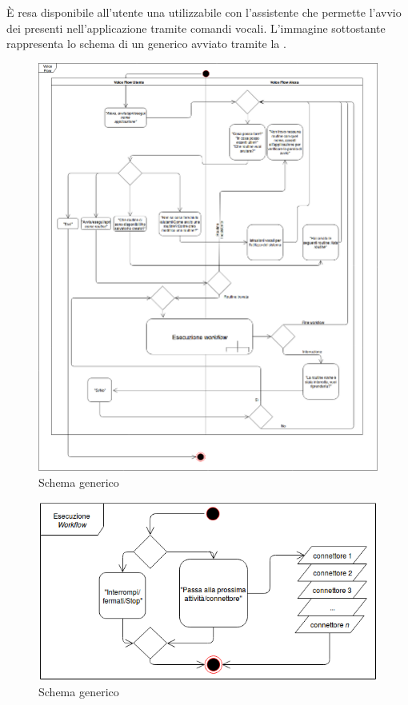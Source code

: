 \clearpage
\section{}
\label{sec:voice_flow}
È resa disponibile all'utente una  utilizzabile con l'assistente   che permette l'avvio dei  presenti nell'applicazione tramite comandi vocali.
L'immagine sottostante rappresenta lo schema di un  generico avviato tramite la .
\begin{figure}[H]
	\centering
	\includegraphics[width=15cm,keepaspectratio]{../includes/pics/voice_flow_alexa-utente_UML.png}
	\caption{\label{fig:mission}Schema  generico}
\end{figure}
\begin{figure}[H]
	\centering
	\includegraphics[width=15cm,keepaspectratio]{../includes/pics/voice_flow_alexa-utente_esecuzione_workflow.png}
	\caption{\label{fig:mission}Schema  generico}
\end{figure}
